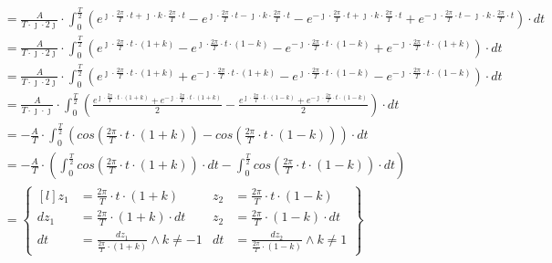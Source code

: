 \begin{align*}
&=\frac{A}{T\cdot \jmath \cdot 2\jmath} \cdot \int_{0}^{\frac{T}{2}}
\left(e^{\jmath \cdot \frac{2\pi}{T} \cdot t + \jmath \cdot k \cdot \frac{2\pi}{T} \cdot t} - e^{\jmath \cdot \frac{2\pi}{T} \cdot t -\jmath \cdot k \cdot \frac{2\pi}{T} \cdot t} - e^{-\jmath \cdot \frac{2\pi}{T} \cdot t+ \jmath \cdot k \cdot \frac{2\pi}{T} \cdot t} + e^{-\jmath \cdot \frac{2\pi}{T} \cdot t -\jmath \cdot k \cdot \frac{2\pi}{T} \cdot t} \right) \cdot dt\\
&=\frac{A}{T\cdot \jmath \cdot 2\jmath} \cdot \int_{0}^{\frac{T}{2}}
\left(e^{\jmath \cdot \frac{2\pi}{T} \cdot t \cdot \left(1+k\right)} - e^{\jmath \cdot \frac{2\pi}{T} \cdot t \cdot \left(1 - k\right)} - e^{-\jmath \cdot \frac{2\pi}{T} \cdot t \cdot \left(1 -k\right)} + e^{-\jmath \cdot \frac{2\pi}{T} \cdot t \cdot \left(1+k\right)} \right) \cdot dt\\
&=\frac{A}{T\cdot\jmath\cdot 2\jmath} \cdot \int_{0}^{\frac{T}{2}}
\left(e^{\jmath \cdot \frac{2\pi}{T} \cdot t \cdot \left(1+k\right)} + e^{-\jmath \cdot \frac{2\pi}{T} \cdot t \cdot \left(1+k\right)} - e^{\jmath \cdot \frac{2\pi}{T} \cdot t \cdot \left(1 - k\right)} - e^{-\jmath \cdot \frac{2\pi}{T} \cdot t \cdot \left(1 -k\right)} \right) \cdot dt\\
&=\frac{A}{T\cdot \jmath \cdot \jmath} \cdot \int_{0}^{\frac{T}{2}}
\left( \frac{e^{\jmath \cdot \frac{2\pi}{T} \cdot t \cdot \left(1+k\right)} + e^{-\jmath \cdot \frac{2\pi}{T} \cdot t \cdot \left(1+k\right)}}{2} - \frac{e^{\jmath \cdot \frac{2\pi}{T} \cdot t \cdot \left(1 - k\right)} + e^{-\jmath \cdot \frac{2\pi}{T} \cdot t \cdot \left(1 -k\right)}}{2} \right) \cdot dt\\
&=-\frac{A}{T} \cdot \int_{0}^{\frac{T}{2}}
\left( cos\left( \frac{2\pi}{T} \cdot t \cdot \left(1+k\right) \right) - cos\left( \frac{2\pi}{T} \cdot t \cdot \left(1 - k\right)\right) \right) \cdot dt\\
&=-\frac{A}{T} \cdot \left( \int_{0}^{\frac{T}{2}}
cos\left( \frac{2\pi}{T} \cdot t \cdot \left(1+k\right) \right) \cdot dt - \int_{0}^{\frac{T}{2}} cos\left( \frac{2\pi}{T} \cdot t \cdot \left(1 - k\right)\right) \cdot dt \right)\\
&=\begin{Bmatrix*}[l]
z_1&=\frac{2\pi}{T} \cdot t \cdot \left(1+k\right) & z_2&=\frac{2\pi}{T} \cdot t \cdot \left(1-k\right)\\
dz_1&=\frac{2\pi}{T} \cdot \left(1+k\right) \cdot dt & z_2&=\frac{2\pi}{T} \cdot \left(1-k\right) \cdot dt\\
dt&=\frac{dz_1}{\frac{2\pi}{T} \cdot \left(1+k\right)} \wedge k \neq -1& dt&=\frac{dz_2}{\frac{2\pi}{T} \cdot \left(1-k\right)} \wedge k \neq 1

\end{Bmatrix*}
\end{align*}

